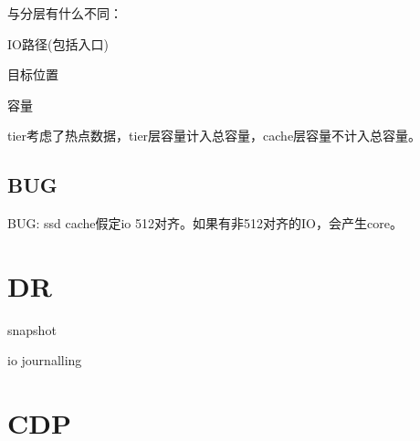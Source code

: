 与分层有什么不同：
\begin{compactitem}
\item IO路径(包括入口)
\item 目标位置
\item 容量
\end{compactitem}

tier考虑了热点数据，tier层容量计入总容量，cache层容量不计入总容量。

\subsection{BUG}

BUG: ssd cache假定io 512对齐。如果有非512对齐的IO，会产生core。
\section{DR}

snapshot

io journalling

\section{CDP}
